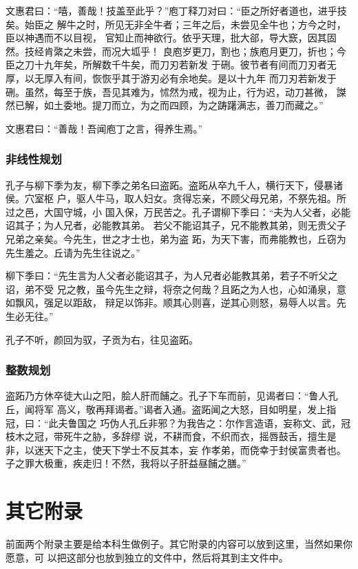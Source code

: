 文惠君曰：“嘻，善哉！技盖至此乎？”庖丁释刀对曰：“臣之所好者道也，进乎技矣。始臣之
解牛之时，所见无非全牛者；三年之后，未尝见全牛也；方今之时，臣以神遇而不以目视，
官知止而神欲行。依乎天理，批大郤，导大窾，因其固然。技经肯綮之未尝，而况大坬乎！
良庖岁更刀，割也；族庖月更刀，折也；今臣之刀十九年矣，所解数千牛矣，而刀刃若新发
于硎。彼节者有间而刀刃者无厚，以无厚入有间，恢恢乎其于游刃必有余地矣。是以十九年
而刀刃若新发于硎。虽然，每至于族，吾见其难为，怵然为戒，视为止，行为迟，动刀甚微，
謋然已解，如土委地。提刀而立，为之而四顾，为之踌躇满志，善刀而藏之。”

文惠君曰：“善哉！吾闻庖丁之言，得养生焉。”


\subsection{非线性规划}
孔子与柳下季为友，柳下季之弟名曰盗跖。盗跖从卒九千人，横行天下，侵暴诸侯。穴室枢
户，驱人牛马，取人妇女。贪得忘亲，不顾父母兄弟，不祭先祖。所过之邑，大国守城，小
国入保，万民苦之。孔子谓柳下季曰：“夫为人父者，必能诏其子；为人兄者，必能教其弟。
若父不能诏其子，兄不能教其弟，则无贵父子兄弟之亲矣。今先生，世之才士也，弟为盗
跖，为天下害，而弗能教也，丘窃为先生羞之。丘请为先生往说之。”

柳下季曰：“先生言为人父者必能诏其子，为人兄者必能教其弟，若子不听父之诏，弟不受
兄之教，虽今先生之辩，将奈之何哉？且跖之为人也，心如涌泉，意如飘风，强足以距敌，
辩足以饰非。顺其心则喜，逆其心则怒，易辱人以言。先生必无往。”

孔子不听，颜回为驭，子贡为右，往见盗跖。

\subsection{整数规划}
盗跖乃方休卒徒大山之阳，脍人肝而餔之。孔子下车而前，见谒者曰：“鲁人孔丘，闻将军
高义，敬再拜谒者。”谒者入通。盗跖闻之大怒，目如明星，发上指冠，曰：“此夫鲁国之
巧伪人孔丘非邪？为我告之：尔作言造语，妄称文、武，冠枝木之冠，带死牛之胁，多辞缪
说，不耕而食，不织而衣，摇唇鼓舌，擅生是非，以迷天下之主，使天下学士不反其本，妄
作孝弟，而侥幸于封侯富贵者也。子之罪大极重，疾走归！不然，我将以子肝益昼餔之膳。”


\chapter{其它附录}
前面两个附录主要是给本科生做例子。其它附录的内容可以放到这里，当然如果你愿意，可
以把这部分也放到独立的文件中，然后将其到主文件中。

